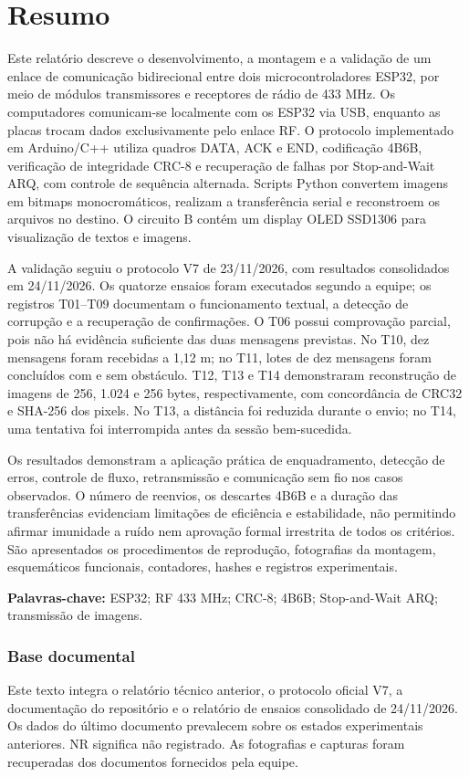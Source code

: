 \clearpage{}\section*{Resumo}
Este relatório descreve o desenvolvimento, a montagem e a validação de um enlace de comunicação bidirecional entre dois microcontroladores ESP32, por meio de módulos transmissores e receptores de rádio de 433 MHz. Os computadores comunicam-se localmente com os ESP32 via USB, enquanto as placas trocam dados exclusivamente pelo enlace RF. O protocolo implementado em Arduino/C++ utiliza quadros DATA, ACK e END, codificação 4B6B, verificação de integridade CRC-8 e recuperação de falhas por Stop-and-Wait ARQ, com controle de sequência alternada. Scripts Python convertem imagens em bitmaps monocromáticos, realizam a transferência serial e reconstroem os arquivos no destino. O circuito B contém um display OLED SSD1306 para visualização de textos e imagens.

A validação seguiu o protocolo V7 de 23/11/2026, com resultados consolidados em 24/11/2026. Os quatorze ensaios foram executados segundo a equipe; os registros T01–T09 documentam o funcionamento textual, a detecção de corrupção e a recuperação de confirmações. O T06 possui comprovação parcial, pois não há evidência suficiente das duas mensagens previstas. No T10, dez mensagens foram recebidas a 1,12 m; no T11, lotes de dez mensagens foram concluídos com e sem obstáculo. T12, T13 e T14 demonstraram reconstrução de imagens de 256, 1.024 e 256 bytes, respectivamente, com concordância de CRC32 e SHA-256 dos pixels. No T13, a distância foi reduzida durante o envio; no T14, uma tentativa foi interrompida antes da sessão bem-sucedida.

Os resultados demonstram a aplicação prática de enquadramento, detecção de erros, controle de fluxo, retransmissão e comunicação sem fio nos casos observados. O número de reenvios, os descartes 4B6B e a duração das transferências evidenciam limitações de eficiência e estabilidade, não permitindo afirmar imunidade a ruído nem aprovação formal irrestrita de todos os critérios. São apresentados os procedimentos de reprodução, fotografias da montagem, esquemáticos funcionais, contadores, hashes e registros experimentais.

\textbf{Palavras-chave:} ESP32; RF 433 MHz; CRC-8; 4B6B; Stop-and-Wait ARQ; transmissão de imagens.

\subsubsection*{Base documental}
Este texto integra o relatório técnico anterior, o protocolo oficial V7, a documentação do repositório e o relatório de ensaios consolidado de 24/11/2026. Os dados do último documento prevalecem sobre os estados experimentais anteriores. NR significa não registrado. As fotografias e capturas foram recuperadas dos documentos fornecidos pela equipe.

